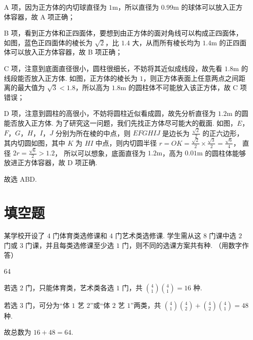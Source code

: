 \begin{solution}
A 项，因为正方体的内切球直径为 \(1\text{m}\)，所以直径为 \(0.99\text{m}\) 的球体可以放入正方体容器，故 A 项正确；

B 项，看到正方体和正四面体，要想到由正方体的面对角线可以构成正四面体，如图，蓝色正四面体的棱长为 \(\sqrt2\)，比 \(1.4\) 大，从而所有棱长均为 \(1.4\text{m}\) 的正四面体可以放入正方体容器，故 B 项正确；

C 项，注意到底面直径很小，圆柱很细长，不妨将其近似成线段，故先看 \(1.8\text{m}\) 的线段能否放入正方体. 如图，正方体的棱长为 \(1\)，则正方体表面上任意两点之间距离的最大值为 \(\sqrt3<1.8\)，所以高为 \(1.8\text{m}\) 的圆柱体不可能放入该正方体，故 C 项错误；

D 项，注意到圆柱的高很小，不妨将圆柱近似看成圆，故先分析直径为 \(1.2\text{m}\) 的圆能否放入正方体. 为了研究这一问题，我们先找正方体尽可能大的截面. 如图，\(E\)，\(F\)，\(G\)，\(H\)，\(I\)，\(J\) 分别为所在棱的中点，则 \(EFGHIJ\) 是边长为 \(\frac{\sqrt2}{2}\) 的正六边形，其内切圆如图，其中 \(K\) 为 \(HI\) 中点，则内切圆半径
\(r=OK=\frac{\sqrt2}{2}\times\frac{\sqrt3}{2}=\frac{\sqrt6}{4}\)，
直径
\(2r=\frac{\sqrt6}{2}>1.2\)，
所以可以想象，底面直径为 \(1.2\text{m}\)，高为 \(0.01\text{m}\) 的圆柱体能够放进正方体容器，故 D 项正确.


故选 ABD.
\end{solution}
\section{填空题}

\begin{problem}
某学校开设了 \(4\) 门体育类选修课和 \(4\) 门艺术类选修课. 学生需从这 \(8\) 门课中选 \(2\) 门或 \(3\) 门课，并且每类选修课至少选 \(1\) 门，则不同的选课方案共有\fillinblank{}种. （用数字作答）
\end{problem}

\begin{answer}
64
\end{answer}

\begin{solution}
若选 \(2\) 门，只能体育类，艺术类各选 \(1\) 门，共
\(\binom41\binom41=16\)
种.

若选 \(3\) 门，可分为“体 \(1\) 艺 \(2\)”或“体 \(2\) 艺 \(1\)”两类，共
\(\binom41\binom42+\binom42\binom41=48\)
种.

故总数为
\(16+48=64\).
\end{solution}

